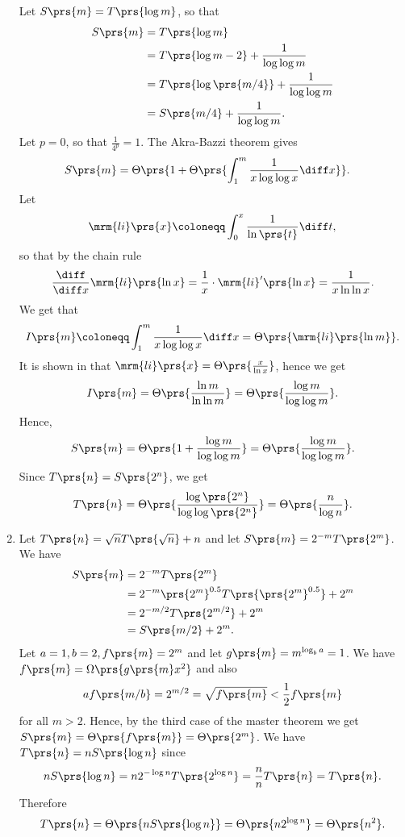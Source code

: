 \documentclass[oneside]{scrbook}
\theoremstyle{definition}
\begin{document}
\begin{problem}
\begin{enumerate}[label=\alph*.]
Let $S\prs{m} = T\prs{\log m}$, so that
\begin{align*}
S\prs{m} &= T\prs{\log m}
\\&= T\prs{\log m - 2} + \frac{1}{\log \log m}
\\&= T\prs{\log\prs{m/4}} + \frac{1}{\log \log m}
\\&= S\prs{m/4} + \frac{1}{\log \log m} \text{.}
\end{align*}
Let $p = 0$, so that $\frac{1}{4^p} = 1$. The Akra-Bazzi theorem gives
\begin{align*}
S\prs{m} &= \Theta\prs{1 + \Theta\prs{\int_1^m \frac{1}{x \log \log x} \diff x}} \text{.}
\end{align*}
Let \[\mrm{li}\prs{x} \coloneqq \int_0^x \frac{1}{\ln\prs{t}} \diff t \text{,}\]
so that by the chain rule
\[\frac{\diff}{\diff x} \mrm{li}\prs{\ln x} = \frac{1}{x} \cdot \mrm{li}'\prs{\ln x} = \frac{1}{x \ln \ln x} \text{.} \]
We get that \[I \prs{m} \coloneqq \int_1^m \frac{1}{x \log \log x} \diff x = \Theta\prs{\mrm{li}\prs{\ln m}} \text{.}\] It is shown in  that $\mrm{li}\prs{x} = \Theta\prs{\frac{x}{\ln x}}$, hence we get 
\[I\prs{m} = \Theta\prs{\frac{\ln m}{\ln \ln m}} = \Theta\prs{\frac{\log m}{\log \log m}} \text{.}\]
Hence,
\begin{align*}
S\prs{m} = \Theta\prs{1 + \frac{\log m}{\log \log m}} = \Theta\prs{\frac{\log m}{\log \log m}} \text{.}
\end{align*}
Since $T\prs{n} = S\prs{2^n}$, we get
\begin{align*}
T\prs{n} = \Theta\prs{\frac{\log \prs{2^n}}{\log \log \prs{2^n}}} = \Theta\prs{\frac{n}{\log n}} \text{.}
\end{align*}
\item %
Let $T\prs{n} = \sqrt{n} T\prs{\sqrt{n}} + n$ and let $S\prs{m} = 2^{-m} T\prs{2^m}$. We have
\begin{align*}
S\prs{m} &= 2^{-m} T\prs{2^m}
\\&= 2^{-m} \prs{2^m}^{0.5} T\prs{\prs{2^m}^{0.5}} + 2^m
\\&= 2^{-m/2} T\prs{2^{m/2}} + 2^m
\\&= S\prs{m/2} + 2^m \text{.} 
\end{align*}
Let $a = 1, b = 2, f\prs{m} = 2^m$ and let $g\prs{m} = m^{\log_b a} = 1$. We have $f\prs{m} = \Omega\prs{g\prs{m} x^2}$ and also
\begin{align*}
a f\prs{m/b} = 2^{m/2} = \sqrt{f\prs{m}} < \frac{1}{2} f\prs{m} 
\end{align*}
for all $m > 2$. Hence, by the third case of the master theorem we get $S\prs{m} = \Theta\prs{f\prs{m}} = \Theta\prs{2^m}$. We have $T\prs{n} = n S\prs{\log n}$ since
\begin{align*}
n S\prs{ \log n} = n 2^{-\log n} T\prs{2^{\log n}} = \frac{n}{n} T\prs{n} = T\prs{n} \text{.}
\end{align*}
Therefore
\[T\prs{n} = \Theta\prs{n S\prs{\log n}} = \Theta\prs{n 2^{\log n}} = \Theta\prs{n^2} \text{.}\]
\end{enumerate}
\end{problem}
\end{document}
